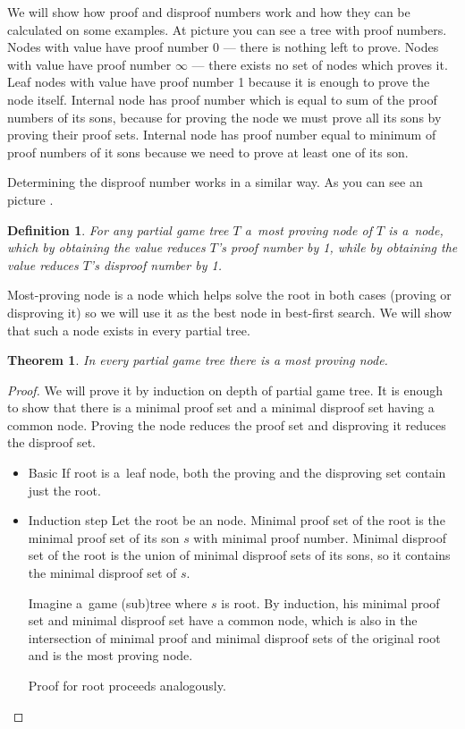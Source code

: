 We will show how proof and disproof numbers work and how they can be calculated
on some examples. At picture  you can see a tree with proof numbers.
Nodes with value \value{true} have proof number 0 --- there is nothing left to
prove. Nodes with value \value{false} have proof number $ \infty $ --- there
exists no set of nodes which proves it. Leaf nodes with value \value{unknown}
have proof number 1 because it is enough to prove the node itself. Internal
 node has proof number which is equal to sum of the proof numbers of
its sons, because for proving the  node we must prove all its sons by
proving their proof sets. Internal  node has proof number equal to
minimum of proof numbers of it sons because we need to prove at least one of
its son.

Determining the disproof number works in a similar way. As you can see an picture
. 

\newtheorem*{mostProvingNode}{Definition}	
\begin{mostProvingNode}
	For any partial game tree $T$ a~{\sl most proving node} of $T$ is a~node, which by 
	obtaining the value \value{true} reduces $T$'s proof number by 1, while by obtaining the
	value \value{false} reduces $T$'s disproof number by 1.
\end{mostProvingNode}

Most-proving node is a node which helps solve the root in both cases (proving or disproving it)
so we will use 
it as the best node in best-first search. We will show that such a node exists in every
partial tree.

\newtheorem{mpnExist}{Theorem}
\begin{mpnExist}
	In every partial game tree there is a most proving node.
\end{mpnExist}

\begin{proof}

	We will prove it by induction on depth of partial game tree.
	It is enough to show that there is a minimal proof set and a minimal disproof set having a 
	common node. Proving the node reduces the proof set and disproving it reduces the
	disproof set.

	\begin{itemize} 
		\item{Basic} 
			If root is a~leaf node, both the proving and the disproving set 
			contain just the root.
		\item{Induction step}
			Let the root be an  node. Minimal proof set of the root is the minimal proof set
			of its son $s$ with minimal proof number. Minimal disproof set of the root
			is the union of minimal disproof sets of its sons, so it contains
			the minimal disproof set of $s$.

			Imagine a~game (sub)tree where $s$ is root. By induction, his
			minimal proof set and minimal disproof set have a common node, which is also 
			in the intersection of minimal proof and minimal disproof sets of the original root and
			is the most proving node.

			Proof for  root proceeds analogously.
	\end{itemize}
\end{proof}

